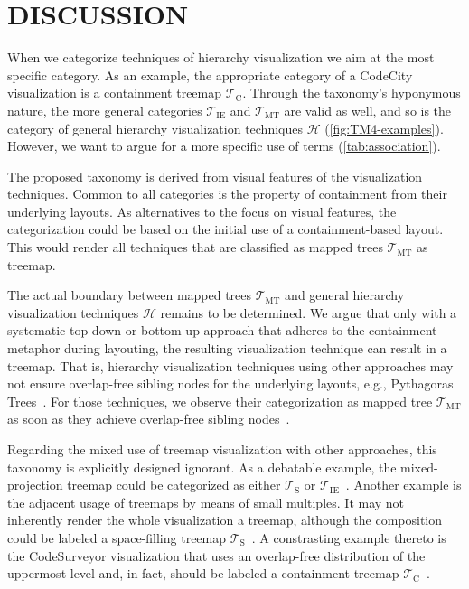 \documentclass[a4paper,twoside]{article}
\newcommand*\Ts {$\mathcal{T}_{\mathrm{S}}$}
\newcommand*\Tc {$\mathcal{T}_{\mathrm{C}}$}
\newcommand*\Tie{$\mathcal{T}_{\mathrm{IE}}$}
\newcommand*\Tmt{$\mathcal{T}_{\mathrm{MT}}$}
\newcommand*\Th{$\mathcal{H}$}
\begin{document}
\section{\uppercase{Discussion}}
\noindent
When we categorize techniques of hierarchy visualization we aim at the most specific category.
As an example, the appropriate category of a CodeCity visualization is a containment treemap \Tc{}.
Through the taxonomy's hyponymous nature, the more general categories \Tie{} and \Tmt{} are valid as well, and so is the category of general hierarchy visualization techniques \Th{} (\autoref{fig:TM4-examples}).
However, we want to argue for a more specific use of terms (\autoref{tab:association}).
\par
The proposed taxonomy is derived from visual features of the visualization techniques.
Common to all categories is the property of containment from their underlying layouts.
As alternatives to the focus on visual features, the categorization could be based on the initial use of a containment-based layout.
This would render all techniques that are classified as mapped trees \Tmt{} as treemap.
\par
The actual boundary between mapped trees \Tmt{} and general hierarchy visualization techniques \Th{} remains to be determined.
We argue that only with a systematic top-down or bottom-up approach that adheres to the containment metaphor during layouting, the resulting visualization technique can result in a treemap.
That is, hierarchy visualization techniques using other approaches may not ensure overlap-free sibling nodes for the underlying layouts, e.g., Pythagoras Trees~\cite{beck2014-pythagorastrees}.
For those techniques, we observe their categorization as mapped tree \Tmt{} as soon as they achieve overlap-free sibling nodes~\cite{munz2019-pythagorastrees}.
\par
Regarding the mixed use of treemap visualization with other approaches, this taxonomy is explicitly designed ignorant.
As a debatable example, the mixed-projection treemap could be categorized as either \Ts{} or \Tie{}~\cite{limberger2017-mixed}.
Another example is the adjacent usage of treemaps by means of small multiples.
It may not inherently render the whole visualization a treemap, although the composition could be labeled a space-filling treemap \Ts{}~\cite{scheibel2016-smallmultiples}.
A constrasting example thereto is the CodeSurveyor visualization that uses an overlap-free distribution of the uppermost level and, in fact, should be labeled a containment treemap \Tc{}~\cite{hawes2015-codesurveyor}.
\end{document}

